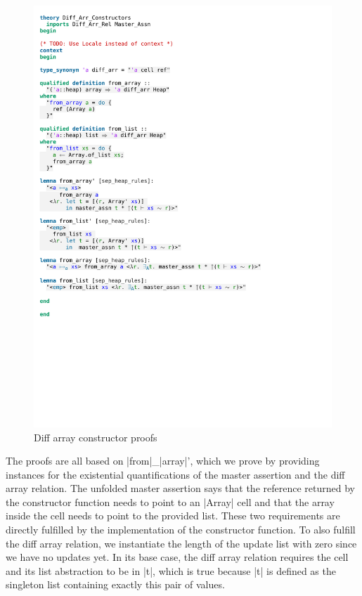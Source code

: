 \begin{figure}[htpb]
    \includegraphics[trim={0 9,6cm 0 12,2cm}, clip, width=1.00\textwidth]{figures/Theory_Diff_Arr_Constructors.pdf}
    \caption[Diff array constructor proofs]{Diff array constructor proofs}
    \label{fig:diff_arr_constructor_proofs}
\end{figure}

\noindent The proofs are all based on |from|\_|array|', which we prove by providing instances for the existential quantifications of the master assertion and the diff array relation. The unfolded master assertion says that the reference returned by the constructor function needs to point to an |Array| cell and that the array inside the cell needs to point to the provided list. These two requirements are directly fulfilled by the implementation of the constructor function. To also fulfill the diff array relation, we instantiate the length of the update list with zero since we have no updates yet. In its base case, the diff array relation requires the cell and its list abstraction to be in |t|, which is true because |t| is defined as the singleton list containing exactly this pair of values.

